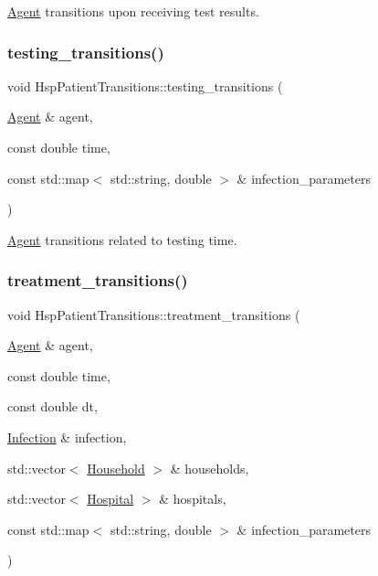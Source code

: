 \hyperlink{classAgent}{Agent} transitions upon receiving test results. 

\mbox{\label{classHspPatientTransitions_a6cf6a821e7ec9aa77a5cb74ff9104d0b}} 
\subsubsection{\texorpdfstring{testing\+\_\+transitions()}{testing\_transitions()}}
{\footnotesize\ttfamily void Hsp\+Patient\+Transitions\+::testing\+\_\+transitions (\begin{DoxyParamCaption}\item[{\hyperlink{classAgent}{Agent} \&}]{agent,  }\item[{const double}]{time,  }\item[{const std\+::map$<$ std\+::string, double $>$ \&}]{infection\+\_\+parameters }\end{DoxyParamCaption})}



\hyperlink{classAgent}{Agent} transitions related to testing time. 

\mbox{\label{classHspPatientTransitions_a1ba8588444d499d5aed74a12bdc07d21}} 
\subsubsection{\texorpdfstring{treatment\+\_\+transitions()}{treatment\_transitions()}}
{\footnotesize\ttfamily void Hsp\+Patient\+Transitions\+::treatment\+\_\+transitions (\begin{DoxyParamCaption}\item[{\hyperlink{classAgent}{Agent} \&}]{agent,  }\item[{const double}]{time,  }\item[{const double}]{dt,  }\item[{\hyperlink{classInfection}{Infection} \&}]{infection,  }\item[{std\+::vector$<$ \hyperlink{classHousehold}{Household} $>$ \&}]{households,  }\item[{std\+::vector$<$ \hyperlink{classHospital}{Hospital} $>$ \&}]{hospitals,  }\item[{const std\+::map$<$ std\+::string, double $>$ \&}]{infection\+\_\+parameters }\end{DoxyParamCaption})}



